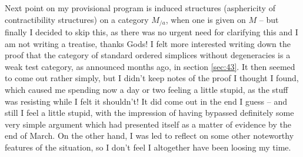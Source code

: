 \label{sec:98}%
Next point on my provisional program is induced structures
(asphericity of contractibility structures) on a category $M_{/a}$,
when one is given on $M$ -- but finally I decided to skip this, as
there was no urgent need for clarifying this and I am not writing a
treatise, thanks Gods! I felt more interested writing down the proof
that the category \Simplexf{} of standard ordered simplices without
degeneracies is a weak test category, as announced months ago, in
section \ref{sec:43}. It then seemed to come out rather
simply, but I didn't keep notes of the proof I thought I found, which
caused me spending now a day or two feeling a little stupid, as the
stuff was resisting while I felt it shouldn't! It did come out in the
end I guess -- and still I feel a little stupid, with the impression
of having bypassed definitely some very simple argument which had
presented itself as a matter of evidence by the end of March. On the
other hand, I was led to reflect on some other noteworthy features of
the situation, so I don't feel I altogether have been loosing my time.


